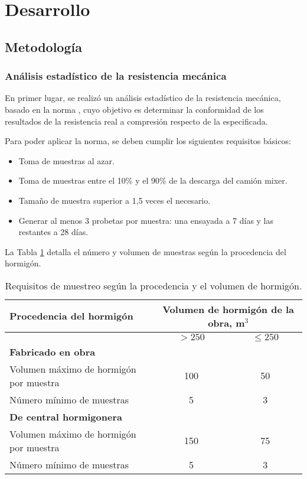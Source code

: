 \section{Desarrollo}

\subsection{Metodología}

\subsubsection{Análisis estadístico de la resistencia mecánica}

En primer lugar, se realizó un análisis estadístico de la resistencia mecánica, basado en la norma \cite{NCh1998}, cuyo objetivo es determinar la conformidad de los resultados de la resistencia real a compresión respecto de la especificada.

Para poder aplicar la norma, se deben cumplir los siguientes requisitos básicos:

\begin{itemize}
    \item Toma de muestras al azar.
    \item Toma de muestras entre el 10\% y el 90\% de la descarga del camión mixer.
    \item Tamaño de muestra superior a 1,5 veces el necesario.
    \item Generar al menos 3 probetas por muestra: una ensayada a 7 días y las restantes a 28 días.
\end{itemize}

La Tabla \ref{tab:muestreo} detalla el número y volumen de muestras según la procedencia del hormigón.

\begin{table}[H]
\centering
\begin{tabular}{|l|c|c|}
\hline
\textbf{Procedencia del hormigón} & \multicolumn{2}{c|}{\textbf{Volumen de hormigón de la obra, m$^3$}} \\ \hline
                                  & $> 250$ & $\leq 250$ \\ \hline
\textbf{Fabricado en obra}        &         &            \\ \hline
Volumen máximo de hormigón por muestra & 100     & 50        \\ \hline
Número mínimo de muestras              & 5       & 3         \\ \hline
\textbf{De central hormigonera}   &         &            \\ \hline
Volumen máximo de hormigón por muestra & 150     & 75        \\ \hline
Número mínimo de muestras              & 5       & 3         \\ \hline
\end{tabular}
\caption{Requisitos de muestreo según la procedencia y el volumen de hormigón.}
\label{tab:muestreo}
\end{table}

